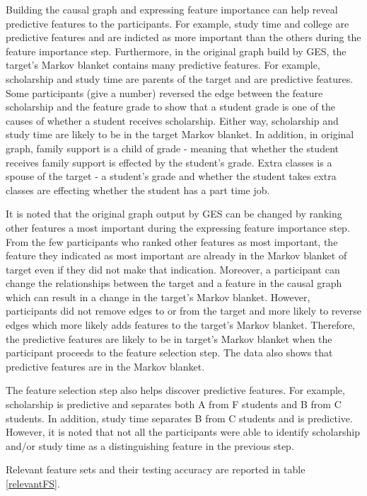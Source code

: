 Building the causal graph and expressing feature importance can help reveal predictive features to the participants. For example, study time and college are predictive features and are indicted as more important than the others during the feature importance step. Furthermore, in the original graph build by GES, the target's Markov blanket contains many predictive features. For example, scholarship and study time are parents of the target and are predictive features. Some participants (give a number) reversed the edge between the feature scholarship and the feature grade to show that a student grade is one of the causes of whether a student receives scholarship. Either way, scholarship and study time are likely to be in the target Markov blanket. In addition, in original graph, family support is a child of grade - meaning that whether the student receives family support is effected by the student’s grade. Extra classes is a spouse of the target - a student’s grade and whether the student takes extra classes are effecting whether the student has a part time job.

It is noted that the original graph output by GES can be changed by ranking other features a most important during the expressing feature importance step. From the few participants who ranked other features as most important, the feature they indicated as most important are already in the Markov blanket of target even if they did not make that indication. Moreover, a participant can change the relationships between the target and a feature in the causal graph which can result in a change in the target's Markov blanket. However, participants did not remove edges to or from the target and more likely to reverse edges which more likely adds features to the target's Markov blanket. Therefore, the predictive features are likely to be in target's Markov blanket when the participant proceeds to the feature selection step. The data also shows that predictive features are in the Markov blanket.

The feature selection step also helps discover predictive features. For example, scholarship is predictive and separates both A from F students and B from C students. In addition, study time separates B from C students and is predictive. However, it is noted that not all the participants were able to identify scholarship and/or study time as a distinguishing feature in the previous step.

Relevant feature sets and their testing accuracy are reported in table \ref{relevantFS}.

